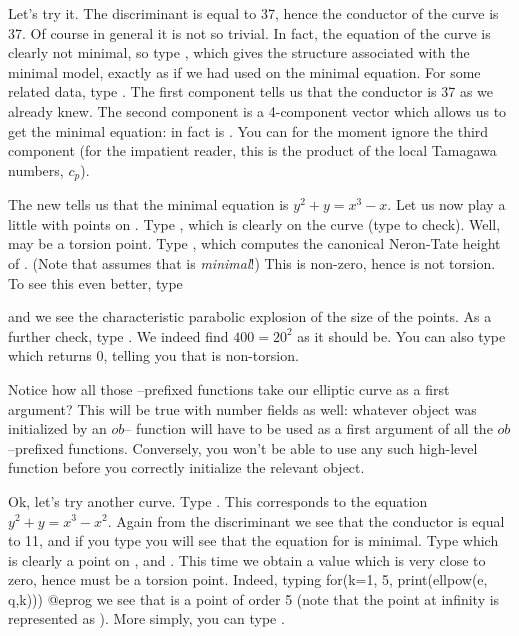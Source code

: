   Let's try it. The discriminant  is equal to 37, hence the
conductor of the curve is 37. Of course in general it is not so trivial. In
fact, the equation of the curve is clearly not minimal, so type , which gives the  structure associated with the
minimal model, exactly as if we had used  on the minimal
equation. For some related data, type . The first
component  tells us that the conductor is 37 as we already knew.
The second component is a 4-component vector which allows us to get the
minimal equation: in fact  is . You can
for the moment ignore the third component  (for the impatient
reader, this is the product of the local Tamagawa numbers, $c_p$).

The new  tells us that the minimal equation is $y^2+y = x^3-x$.
Let us now play a little with points on . Type , which is
clearly on the curve (type  to check). Well, 
may be a torsion point. Type , which computes the
canonical Neron-Tate height of . (Note that  assumes
that  is \emph{minimal}!) This is non-zero, hence  is not
torsion. To see this even better, type


\noindent and we see the characteristic parabolic explosion of the size of
the points. As a further check, type
. We indeed find
$400=20^2$ as it should be. You can also type  which
returns 0, telling you that  is non-torsion.

Notice how all those --prefixed functions take our elliptic curve as
a first argument? This will be true with number fields as well: whatever
object was initialized by an $ob$-- function will have to be used as
a first argument of all the $ob$--prefixed functions. Conversely, you won't be
able to use any such high-level function before you correctly initialize the
relevant object. \smallskip

Ok, let's try another curve. Type . This
corresponds to the equation $y^2+y = x^3-x^2$. Again from the discriminant
we see that the conductor is equal to 11, and if you type
 you will see that the equation  for  is
minimal. Type  which is clearly a point on , and
. This time we obtain a value which is very close to
zero, hence  must be a torsion point. Indeed, typing
\bprog
for(k=1, 5, print(ellpow(e, q,k)))
@eprog\noindent
we see that  is a point of order 5 (note that the point at infinity is
represented as \kbd{[0]}). More simply, you can type .\smallskip

